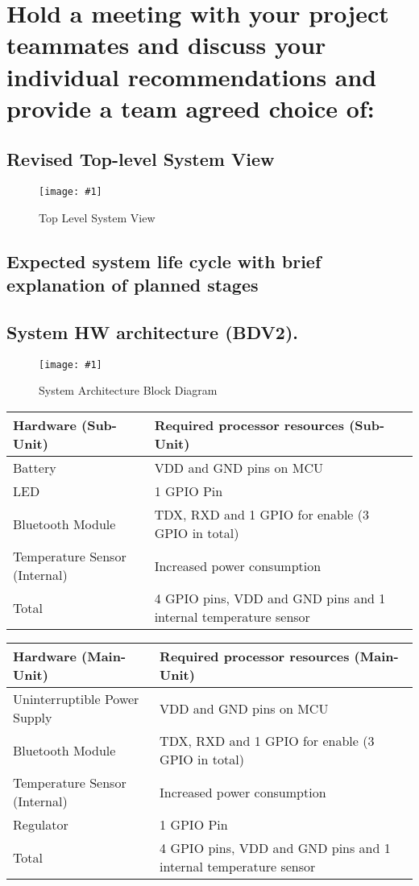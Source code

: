 \documentclass[12pt]{article} \usepackage{jeep} \usepackage{unicode}
\newcommand\createfigure[2]{
  \begin{figure}[H]
    \centering \texttt{[image: \#1]}
    \caption{#2}
  \end{figure}}
\begin{document}
\linespread{2.0}
\section{Hold a meeting with your project teammates and discuss your individual
  recommendations and provide a team agreed choice of:}
\subsection{Revised Top-level System View}
\createfigure{../Figures/global-system-view.png}{Top Level System View}
\subsection{Expected system life cycle with brief explanation of planned stages}
\subsection{System HW architecture (BDV2).}
\createfigure{../Figures/system-architecture-block-diagram.jpg}{System
  Architecture Block Diagram}
\newpage
\begin{center}
  \begin{tabularx}{\textwidth}{|X|X|}
    \hline
    Hardware (Sub-Unit) & Required processor resources (Sub-Unit)\\
    \hline
    Battery & VDD and GND pins on MCU\\
    \hline
    LED & 1 GPIO Pin\\
    \hline
    Bluetooth Module & TDX, RXD and 1 GPIO for enable (3 GPIO in total)\\
    \hline
    Temperature Sensor (Internal) & Increased power consumption\\
    \hline
    Total & 4 GPIO pins, VDD and GND pins and 1 internal temperature sensor\\
    \hline
  \end{tabularx}
\end{center}
\begin{center}
  \begin{tabularx}{\textwidth}{|X|X|}
    \hline
    Hardware (Main-Unit) & Required processor resources (Main-Unit)\\
    \hline
    Uninterruptible Power Supply & VDD and GND pins on MCU\\
    \hline
    Bluetooth Module & TDX, RXD and 1 GPIO for enable (3 GPIO in total)\\
    \hline
    Temperature Sensor (Internal) & Increased power consumption\\
    \hline
    Regulator & 1 GPIO Pin\\
    \hline
    Total & 4 GPIO pins, VDD and GND pins and 1 internal temperature sensor\\
    \hline
  \end{tabularx}
\end{center}
\end{document}
